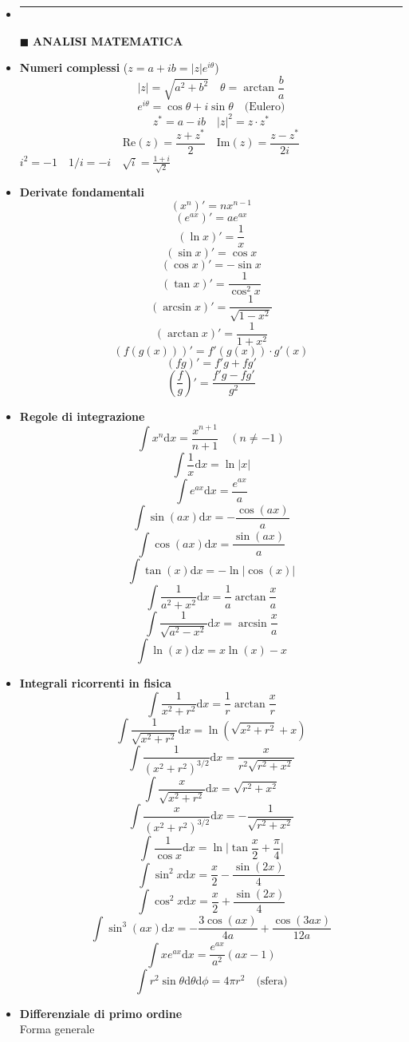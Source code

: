\documentclass{book}
\newcommand{\g}{\textbf}
\newcommand{\e}{\begin{equation}}
\newcommand{\ex}{\end{equation} }
\renewcommand{\it}{\item[$\cdot$]}
\newcommand{\sep}{\item[]\rule{\linewidth}{0.4pt}}
\begin{document}
\begin{multicols}{4}
\begin{itemize}
\sep
\item [$\blacksquare$] \g{ANALISI MATEMATICA}
    \it \g{Numeri complessi} ($z=a+ib=|z|e^{i\theta}$)
        \e{|z|=\sqrt{a^2+b^2} \quad \theta=\arctan\frac{b}{a}}\ex
        \e{e^{i\theta}=\cos\theta+i\sin\theta \quad \text{(Eulero)}}\ex
        \e{z^*=a-ib \quad |z|^2=z \cdot z^*}\ex
        \e{\text{Re}(z)=\frac{z+z^*}{2} \quad \text{Im}(z)=\frac{z-z^*}{2i}}\ex
        $i^2=-1 \quad 1/i=-i \quad \sqrt{i}=\frac{1+i}{\sqrt{2}}$ \\
    \it \g{Derivate fondamentali}
        \e{(x^n)'=nx^{n-1}}\ex
        \e{(e^{ax})'=ae^{ax}}\ex
        \e{(\ln x)'=\frac{1}{x}}\ex
        \e{(\sin x)'=\cos x}\ex
        \e{(\cos x)'=-\sin x}\ex
        \e{(\tan x)'=\frac{1}{\cos^2 x}}\ex
        \e{(\arcsin x)'=\frac{1}{\sqrt{1-x^2}}}\ex
        \e{(\arctan x)'=\frac{1}{1+x^2}}\ex
        \e{(f(g(x)))'=f'(g(x))\cdot g'(x)}\ex
        \e{(fg)'=f'g+fg'}\ex
        \e{\left(\frac{f}{g}\right)'=\frac{f'g-fg'}{g^2}}\ex
    \it \g{Regole di integrazione}
        \e{\int x^n\mathrm{d}x=\frac{x^{n+1}}{n+1} \quad (n\neq -1)}\ex
        \e{\int \frac{1}{x}\mathrm{d}x=\ln|x|}\ex
        \e{\int e^{ax}\mathrm{d}x=\frac{e^{ax}}{a}}\ex
        \e{\int \sin(ax)\mathrm{d}x=-\frac{\cos(ax)}{a}}\ex
        \e{\int \cos(ax)\mathrm{d}x=\frac{\sin(ax)}{a}}\ex
        \e{\int \tan(x)\mathrm{d}x=-\ln|\cos(x)|}\ex
        \e{\int \frac{1}{a^2+x^2}\mathrm{d}x=\frac{1}{a}\arctan\frac{x}{a}}\ex
        \e{\int \frac{1}{\sqrt{a^2-x^2}}\mathrm{d}x=\arcsin\frac{x}{a}}\ex
        \e{\int \ln(x)\mathrm{d}x=x\ln(x)-x}\ex
    \it \g{Integrali ricorrenti in fisica}
        \e{\int\frac{1}{x^2+r^2}\mathrm{d}x=\frac{1}{r}\arctan\frac{x}{r}}\ex
        \e{\int\frac{1}{\sqrt{x^2+r^2}}\mathrm{d}x=\ln{(\sqrt{x^2+r^2}+x)}}\ex
        \e{\int\frac{1}{(x^2+r^2)^{3/2}}\mathrm{d}x=\frac{x}{r^2\sqrt{r^2+x^2}}}\ex
        \e{\int\frac{x}{\sqrt{x^2+r^2}}\mathrm{d}x=\sqrt{r^2+x^2}}\ex
        \e{\int\frac{x}{(x^2+r^2)^{3/2}}\mathrm{d}x=-\frac{1}{\sqrt{r^2+x^2}}}\ex
        \e{\int\frac{1}{\cos{x}}\mathrm{d}x=\ln\biggl|\tan\frac{x}{2}+\frac{\pi}{4}\biggr|}\ex
        \e{\int\sin^2{x}\mathrm{d}x=\frac{x}{2}-\frac{\sin(2x)}{4}}\ex
        \e{\int\cos^2{x}\mathrm{d}x=\frac{x}{2}+\frac{\sin(2x)}{4}}\ex
        \e{\int\sin^3{(ax)}\mathrm{d}x=-\frac{3\cos{(ax)}}{4a}+\frac{\cos{(3ax)}}{12a}}\ex
        \e{\int x e^{ax}\mathrm{d}x=\frac{e^{ax}}{a^2}(ax-1)}\ex
        \e{\int r^2\sin\theta\mathrm{d}\theta\mathrm{d}\phi=4\pi r^2 \quad \text{(sfera)}}\ex
        \it \g{Differenziale di primo ordine}\\
        Forma generale

\end{itemize}
\end{multicols}
\end{document}
